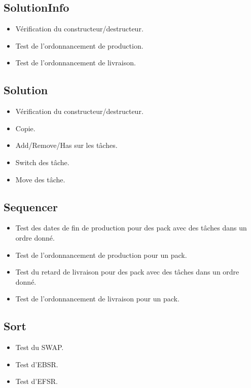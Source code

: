 \documentclass[hideweeklyreports]{polytech/polytech}
\begin{document}
			\subsection{SolutionInfo}
				\begin{itemize}
					\item Vérification du constructeur/destructeur.
					\item Test de l'ordonnancement de production.
					\item Test de l'ordonnancement de livraison.
				\end{itemize}
				
			\subsection{Solution}
				\begin{itemize}
					\item Vérification du constructeur/destructeur.
					\item Copie.
					\item Add/Remove/Has sur les tâches.
					\item Switch des tâche.
					\item Move des tâche.
				\end{itemize}
				
			\subsection{Sequencer}
				\begin{itemize}
					\item Test des dates de fin de production pour des pack avec des tâches dans un ordre donné.
					\item Test de l'ordonnancement de production pour un pack.
					\item Test du retard de livraison pour des pack avec des tâches dans un ordre donné.
					\item Test de l'ordonnancement de livraison pour un pack.
				\end{itemize}
				
			\subsection{Sort}
				\begin{itemize}
					\item Test du SWAP.
					\item Test d'EBSR.
					\item Test d'EFSR.
				\end{itemize}
				
\end{document}
